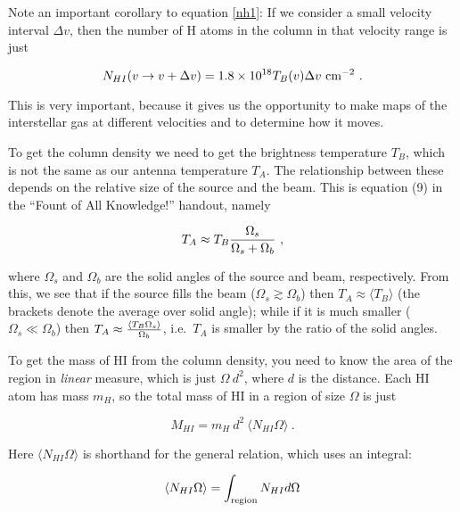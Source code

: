 \documentclass[preprint]{aastex}
\begin{document}
          Note an important corollary to equation \ref{nh1}: If we
consider a small velocity interval $\Delta v$, then the number of H
atoms in the column in that velocity range is just 

\begin{equation} \label{nh2}
N_{HI}(v \rightarrow v + \Delta v) = 1.8 \times 10^{18} T_{B}(v) \Delta
v \ {\rm cm^{-2}} \ .  
\end{equation}

\noindent This is very important, because it gives us the opportunity to
make maps of the interstellar gas at different velocities and to
determine how it moves.

	To get the column density we need to get the brightness
temperature $T_B$, which is not the same as our antenna temperature
$T_A$. The relationship between these depends on the relative size of
the source and the beam. This is equation (9) in the ``Fount of All
Knowledge!'' handout, namely 

\begin{equation} \label{taeqn}
T_A \approx T_B {\Omega_s \over \Omega_s + \Omega_b} \ ,
\end{equation}

\noindent where $\Omega_s$ and $\Omega_b$ are the solid angles of the
source and beam, respectively. From this, we see that if the source
fills the beam ($\Omega_s \gtrsim \Omega_b$) then $T_A \approx \langle
T_B\rangle$ (the brackets denote the average over solid angle);
while if it is much smaller ($\Omega_s \ll \Omega_b$) then $T_A \approx
{\langle T_B \Omega_s\rangle \over \Omega_b}$, i.e.\ $T_A$ is smaller by the ratio of
the solid angles. 

	To get the mass of HI from the column density, you need to know
the area of the region in {\it linear} measure, which is just $\Omega \
d^2$, where $d$ is the distance.  Each HI atom has mass $m_H$, so the
total mass of HI in a region of size $\Omega$ is just

\begin{mathletters} \label{masseqn}
\begin{equation} 
M_{HI} = m_H \ d^2 \ \langle N_{HI} \Omega\rangle \ .
\end{equation}

\noindent Here $\langle N_{HI} \Omega \rangle$ is shorthand for the
general relation, which uses an integral:

\begin{equation}
\langle N_{HI} \Omega \rangle = \int_{\rm region} N_{HI} d \Omega
\end{equation}
\end{mathletters}
\end{document}
